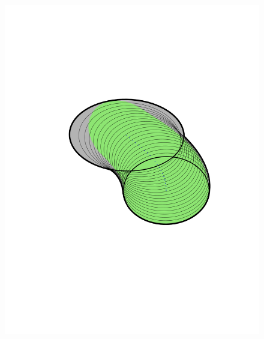 \begin{figure}[!t]
  \begin{minipage}[r]{0.3\columnwidth}
    \includegraphics[width=1\columnwidth, trim={0cm 6cm 0cm
      6cm}]{figures/method/FunnelSimnew4}
  \end{minipage}
  \begin{minipage}[c]{0.3\columnwidth}

\end{minipage}
\end{figure}

